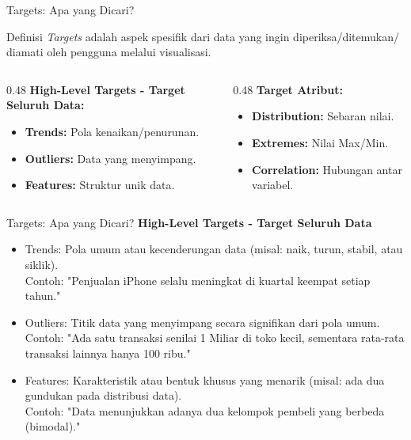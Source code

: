 \documentclass[t]{beamer}
\begin{document}
\begin{frame}{Targets: Apa yang Dicari?}
    \begin{block}{Definisi}
        \textit{Targets} adalah aspek spesifik dari data yang ingin diperiksa/ditemukan/ diamati oleh pengguna melalui visualisasi.
    \end{block}

    \vspace{0.3cm}
    \begin{columns}[t]
        \begin{column}{0.48\textwidth}
            \textbf{High-Level Targets - Target Seluruh Data:}
            \begin{itemize}
                \item \textbf{Trends:} Pola kenaikan/penurunan.
                \item \textbf{Outliers:} Data yang menyimpang.
                \item \textbf{Features:} Struktur unik data.
            \end{itemize}
        \end{column}
        
        \begin{column}{0.48\textwidth}
            \textbf{Target Atribut:}
            \begin{itemize}
                \item \textbf{Distribution:} Sebaran nilai.
                \item \textbf{Extremes:} Nilai Max/Min.
                \item \textbf{Correlation:} Hubungan antar variabel.
            \end{itemize}
        \end{column}
    \end{columns}
\end{frame}

\begin{frame}{Targets: Apa yang Dicari?}
\textbf{High-Level Targets - Target Seluruh Data}
\begin{itemize}
	\item Trends: Pola umum atau kecenderungan data (misal: naik, turun, stabil, atau siklik).\\
	Contoh: "Penjualan iPhone selalu meningkat di kuartal keempat setiap tahun."
	\item Outliers: Titik data yang menyimpang secara signifikan dari pola umum.\\
	Contoh: "Ada satu transaksi senilai 1 Miliar di toko kecil, sementara rata-rata transaksi lainnya hanya 100 ribu."
	\item Features: Karakteristik atau bentuk khusus yang menarik (misal: ada dua gundukan pada distribusi data).\\
	Contoh: "Data menunjukkan adanya dua kelompok pembeli yang berbeda (bimodal)."
\end{itemize}
\end{frame}
\end{document}
